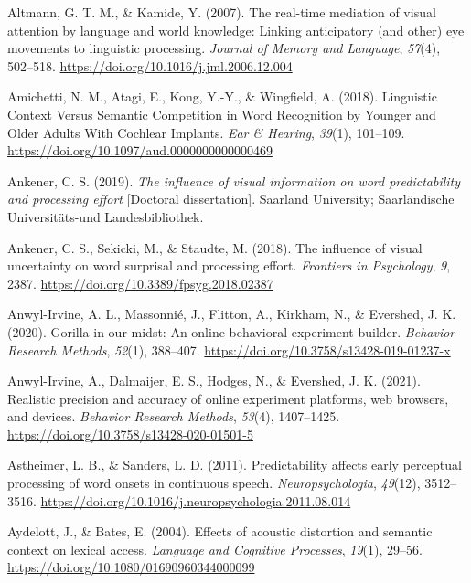 \documentclass[a4paper, nobind]{templates/ociamthesis}
\newlength{\cslhangindent}
\newenvironment{CSLReferences}[2] %
 {%
  \setlength{\parindent}{0pt}
  \ifodd #1
  \let\oldpar\par
  \def\par{\hangindent=\cslhangindent\oldpar}
  \fi
  \setlength{\parskip}{1mm}
  \setlength{\baselineskip}{6mm}
 }%
 {}
\begin{document}
\begin{CSLReferences}{1}{0}
\leavevmode{}%
Altmann, G. T. M., \& Kamide, Y. (2007). {The real-time mediation of visual attention by language and world knowledge: Linking anticipatory (and other) eye movements to linguistic processing}. \emph{Journal of Memory and Language}, \emph{57}(4), 502--518. \url{https://doi.org/10.1016/j.jml.2006.12.004}

\leavevmode{}%
Amichetti, N. M., Atagi, E., Kong, Y.-Y., \& Wingfield, A. (2018). Linguistic Context Versus Semantic Competition in Word Recognition by Younger and Older Adults With Cochlear Implants. \emph{Ear \& Hearing}, \emph{39}(1), 101--109. \url{https://doi.org/10.1097/aud.0000000000000469}

\leavevmode{}%
Ankener, C. S. (2019). \emph{{The influence of visual information on word predictability and processing effort}} {[}Doctoral dissertation{]}. Saarland University; Saarl{ä}ndische Universit{ä}ts-und Landesbibliothek.

\leavevmode{}%
Ankener, C. S., Sekicki, M., \& Staudte, M. (2018). {The influence of visual uncertainty on word surprisal and processing effort}. \emph{Frontiers in Psychology}, \emph{9}, 2387. \url{https://doi.org/10.3389/fpsyg.2018.02387}

\leavevmode{}%
Anwyl-Irvine, A. L., Massonnié, J., Flitton, A., Kirkham, N., \& Evershed, J. K. (2020). {Gorilla in our midst: An online behavioral experiment builder}. \emph{Behavior Research Methods}, \emph{52}(1), 388--407. \url{https://doi.org/10.3758/s13428-019-01237-x}

\leavevmode{}%
Anwyl-Irvine, A., Dalmaijer, E. S., Hodges, N., \& Evershed, J. K. (2021). {Realistic precision and accuracy of online experiment platforms, web browsers, and devices}. \emph{Behavior Research Methods}, \emph{53}(4), 1407--1425. \url{https://doi.org/10.3758/s13428-020-01501-5}

\leavevmode{}%
Astheimer, L. B., \& Sanders, L. D. (2011). {Predictability affects early perceptual processing of word onsets in continuous speech}. \emph{Neuropsychologia}, \emph{49}(12), 3512--3516. \url{https://doi.org/10.1016/j.neuropsychologia.2011.08.014}

\leavevmode{}%
Aydelott, J., \& Bates, E. (2004). {Effects of acoustic distortion and semantic context on lexical access}. \emph{Language and Cognitive Processes}, \emph{19}(1), 29--56. \url{https://doi.org/10.1080/01690960344000099}


\end{CSLReferences}
\end{document}
